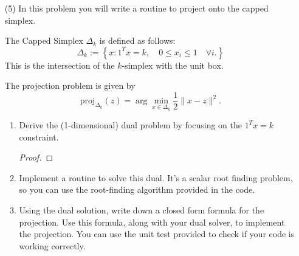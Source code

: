 \documentclass[11pt]{amsart}
\begin{document}
\vskip 16pt
\begin{enumerate}
\item[(5)] In this problem you will write a routine to project onto the capped simplex. 

The Capped Simplex $\Delta_k$ is defined as follows: 
\[
\Delta_k := \left\{x: 1^Tx = k, \quad 0 \leq x_i \leq 1 \quad \forall i. \right\}
\]
This is the intersection of the $k$-simplex with the unit box. 

The projection problem is given by 
\[
\mbox{proj}_{\Delta_k}(z) = \arg\min_{x \in \Delta_k} \frac{1}{2}\|x-z\|^2.
\]
\begin{enumerate}
\item Derive the (1-dimensional) dual problem by focusing on the $1^Tx = k$ constraint. 
  \begin{proof}
  \end{proof}
\item Implement a routine to solve this dual. It's a scalar root finding problem, 
so you can use the root-finding algorithm provided in the code.  
\bigskip \bigskip
\item Using the dual solution, write down a closed form formula for the projection.  
Use this formula, along with your dual solver, to implement the projection. You can use the unit test 
provided to check if your code is working correctly. 


\end{enumerate}




\end{enumerate}
\end{document}

